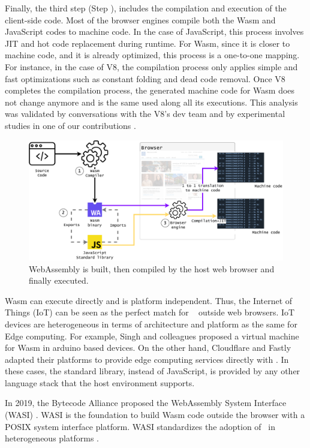 Finally, the third step (Step ), includes the compilation and execution of the client-side code. Most of the browser engines compile both the Wasm  and JavaScript codes to machine code. In the case of JavaScript, this process involves JIT and hot code replacement during runtime. For Wasm, since it is closer to machine code, and it is already optimized, this process is a one-to-one mapping. For instance, in the case of V8, the compilation process only applies simple and fast optimizations such as constant folding and dead code removal. Once V8 completes the compilation process, the generated machine code for Wasm does not change anymore and is the same used along all its executions. This analysis was validated by conversations with the V8's dev team and by experimental studies in one of our contributions \cite{CROW}.  

\begin{figure}[h]
    \centering
    \includegraphics[width=\linewidth]{diagrams/wasm_workflow.pdf}
    \caption{WebAssembly is built, then compiled by the host web browser and finally executed. }
    \label{diagrams:sota:wasm}
\end{figure}

Wasm can execute directly and is platform independent.
Thus, the Internet of Things (IoT) can be seen as the perfect match for \wasm\ \cite{Narayan2021Swivel,Sledge} outside web browsers.
IoT devices are heterogeneous in terms of architecture and platform as the same for Edge computing.
For example, Singh and colleagues \cite{WARDuino2019} proposed a virtual machine for Wasm in arduino based devices.
On the other hand, Cloudflare and Fastly adapted their platforms to provide edge computing services directly with \wasm. 
In these cases, the standard library, instead of JavaScript, is provided by any other language stack that the host environment supports.

In 2019, the Bytecode Alliance \cite{bytecodealliance} proposed the WebAssembly System Interface (WASI) \cite{WASI}. 
WASI is the foundation to build Wasm code outside the browser with a POSIX system interface platform. 
WASI standardizes the adoption of \wasm\ in heterogeneous platforms \cite{bryant2020webassembly}. 

